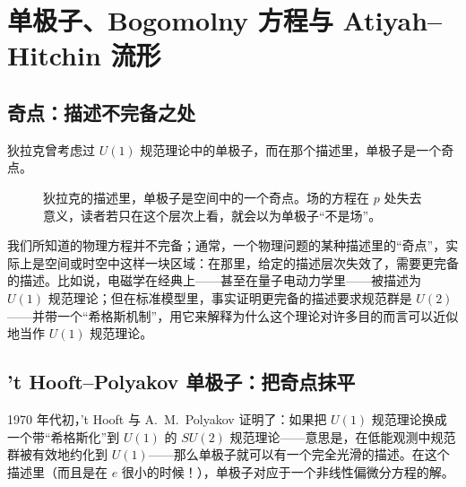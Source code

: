 \section{单极子、Bogomolny 方程与 Atiyah--Hitchin 流形}

\par\medskip

\subsection{奇点：描述不完备之处}

狄拉克曾考虑过 $U(1)$ 规范理论中的单极子，而在那个描述里，单极子是一个奇点。

\begin{figure}[htbp]
\centering
{}
\caption{狄拉克的描述里，单极子是空间中的一个奇点。场的方程在 $p$ 处失去意义，读者若只在这个层次上看，就会以为单极子“不是场”。}
\label{fig:singularity}
\end{figure}

我们所知道的物理方程并不完备；通常，一个物理问题的某种描述里的“奇点”，实际上是空间或时空中这样一块区域：在那里，给定的描述层次失效了，需要更完备的描述。比如说，电磁学在经典上——甚至在量子电动力学里——被描述为 $U(1)$ 规范理论；但在标准模型里，事实证明更完备的描述要求规范群是 $U(2)$——并带一个“希格斯机制”，用它来解释为什么这个理论对许多目的而言可以近似地当作 $U(1)$ 规范理论。

\subsection{\texorpdfstring{'t Hooft--Polyakov}{'t Hooft-Polyakov} 单极子：把奇点抹平}

1970 年代初，'t Hooft 与 A.~M.~Polyakov 证明了：如果把 $U(1)$ 规范理论换成一个带“希格斯化”到 $U(1)$ 的 $SU(2)$ 规范理论——意思是，在低能观测中规范群被有效地约化到 $U(1)$——那么单极子就可以有一个完全光滑的描述。在这个描述里（而且是在 $e$ 很小的时候！），单极子对应于一个非线性偏微分方程的解。

